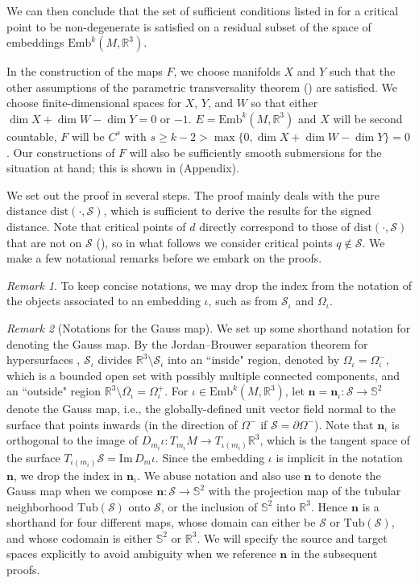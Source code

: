 \documentclass[11pt]{article}
\newcommand{\R}{\mathbb{R}}
\newcommand{\Sbb}{\mathbb{S}}
\newcommand{\io}{\iota}
\newcommand{\nbf}{\mathbf{n}}
\newcommand{\W}{\Omega}
\newcommand{\bord}{\partial}
\newcommand{\Emb}{\mathrm{Emb}^k(M,\R^3)}
\newcommand{\dist}{\mathrm{dist}}
\newcommand{\Surf}{\mathcal{S}}
\renewcommand{\Im}{\mathrm{Im} \,}
\theoremstyle{plain}
\theoremstyle{definition}
\theoremstyle{remark}
\newtheorem{rmk}{Remark}
\begin{document}
We can then conclude that the set of sufficient conditions listed in  for a critical point to be non-degenerate is satisfied on a residual subset of the space of embeddings $\Emb$.

In the construction of the maps $F$, we choose manifolds $X$ and $Y$ such that the other assumptions of the parametric transversality theorem () are satisfied. We choose finite-dimensional spaces for $X$, $Y$, and $W$ so that either $\dim X + \dim W - \dim Y = 0$ or $-1$. $E = \Emb$ and $X$ will be second countable, $F$ will be $C^{s}$ with $s \geq k - 2 > \max \{ 0, \dim X + \dim W - \dim Y \} = 0$. Our constructions of $F$ will also  be sufficiently smooth submersions for the situation at hand; this is shown in  (Appendix).

We set out the proof in several steps. The proof mainly deals with the pure distance $\dist(\cdot, \Surf)$, which is sufficient to derive the results for the signed distance. Note that critical points of $d$ directly correspond to those of $\dist(\cdot, \Surf)$ that are not on $\Surf$ (), so in what follows we consider critical points $q \notin \Surf$. 
We make a few notational remarks before we embark on the proofs.

\begin{rmk}
To keep concise notations, we may drop the index from the notation of the objects associated to an embedding $\iota$, such as from $\Surf_\iota$ and $\W_\iota$.
\end{rmk}

\begin{rmk}[Notations for the Gauss map]
	\label{rmk:gauss_map_notation}
	We set up some shorthand notation for denoting the Gauss map. By the Jordan--Brouwer separation theorem for hypersurfaces \citep{lima_jordan-brouwer_1988,mcgrath_smooth_2016}, $\Surf_\iota$ divides $\R^3 \setminus \Surf_\iota$ into an ``inside" region, denoted by $\W_\iota = \W_\iota^-$, which is a bounded open set with possibly multiple connected components, and an ``outside" region $\R^3 \setminus \overline{\W_\iota} = \W_\iota^+$. For $\io \in \Emb$, let $\nbf = \nbf_\io : \Surf \to \mathbb{S}^2$ denote the Gauss map, i.e., the globally-defined unit vector field normal to the surface that points inwards (in the direction of $\W^-$ if $\Surf = \bord \W^-$). Note that $\nbf_\io$ is orthogonal to the image of $D_{m_i} \io : T_{m_i} M \to T_{\iota(m_i)}\R^3$, which is the tangent space of the surface $T_{\iota(m_i)} \Surf = \Im D_m\io$. Since the embedding $\iota$ is implicit in the notation $\nbf$, we drop the index in $\nbf_\io$.
    We abuse notation and also use $\nbf$ to denote the Gauss map when we compose $\nbf:\Surf \to \mathbb{S}^2$ with the projection map of the tubular neighborhood $\mathrm{Tub}(\Surf)$ onto $\Surf$, or the inclusion of $\Sbb^2$ into $\R^3$. Hence $\nbf$ is a shorthand for four different maps, whose domain can either be $\Surf$ or $\mathrm{Tub}(\Surf)$, and whose codomain is either $\mathbb{S}^2$ or $\R^3$. We will specify the source and target spaces explicitly to avoid ambiguity when we reference $\nbf$ in the subsequent proofs.
\end{rmk}
\end{document}
